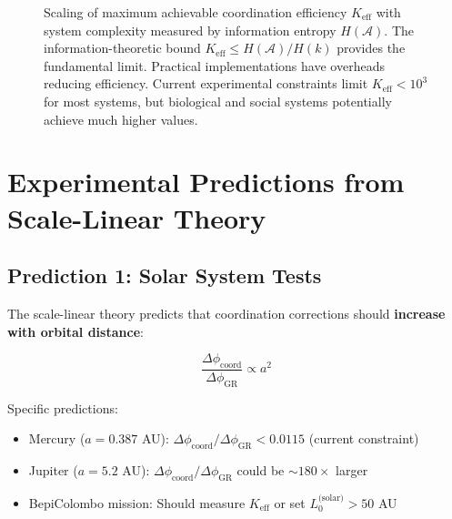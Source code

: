 \documentclass[11pt,a4paper]{article}
\begin{document}
\begin{figure}[htbp]
{
		}
		\caption{Scaling of maximum achievable coordination efficiency $K_{\mathrm{eff}}$ with system complexity measured by information entropy $H(\mathcal{A})$. The information-theoretic bound $K_{\mathrm{eff}} \leq H(\mathcal{A})/H(k)$ provides the fundamental limit. Practical implementations have overheads reducing efficiency. Current experimental constraints limit $K_{\mathrm{eff}} < 10^3$ for most systems, but biological and social systems potentially achieve much higher values.}
		\label{fig:keff-scaling}
	\end{figure}
	
	\section{Experimental Predictions from Scale-Linear Theory}
	\label{sec:scale-predictions}
	
	\subsection{Prediction 1: Solar System Tests}
	
	The scale-linear theory predicts that coordination corrections should 
	\textbf{increase with orbital distance}:
	
	\begin{equation}
		\frac{\Delta\phi_{\text{coord}}}{\Delta\phi_{\text{GR}}} \propto a^2
	\end{equation}
	
	Specific predictions:
	\begin{itemize}
		\item Mercury ($a = 0.387$ AU): $\Delta\phi_{\text{coord}}/\Delta\phi_{\text{GR}} < 0.0115$ (current constraint)
		\item Jupiter ($a = 5.2$ AU): $\Delta\phi_{\text{coord}}/\Delta\phi_{\text{GR}}$ could be $\sim 180\times$ larger
		\item BepiColombo mission: Should measure $K_{\mathrm{eff}}$ or set $L_0^{\text{(solar)}} > 50$ AU
	\end{itemize}
	
\end{document}
